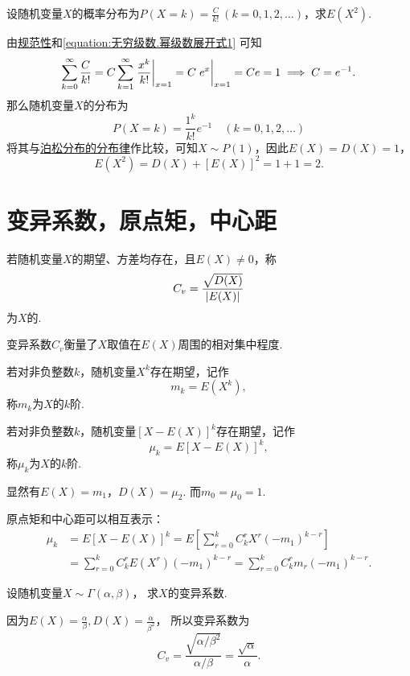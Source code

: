 \begin{example}
设随机变量\(X\)的概率分布为\(P(X=k) = \frac{C}{k!}\ (k=0,1,2,\dotsc)\)，求\(E(X^2)\).
\begin{solution}
由\hyperref[theorem:随机变量及其分布.离散型随机变量的密度函数的性质]{规范性}和\cref{equation:无穷级数.幂级数展开式1} 可知\[
\sum_{k=0}^\infty \frac{C}{k!}
= C \sum_{k=1}^\infty \eval{\frac{x^k}{k!}}_{x=1}
= C \eval{e^x}_{x=1}
= C e = 1
\implies
C = e^{-1}.
\]那么随机变量\(X\)的分布为\[
P(X=k) = \frac{1^k}{k!} e^{-1} \quad(k=0,1,2,\dotsc)
\]将其与\hyperref[equation:随机变量及其分布.泊松分布的分布律]{泊松分布的分布律}作比较，可知\(X \sim P(1)\)，因此\(E(X) = D(X) = 1\)，\[
E(X^2) = D(X) + [E(X)]^2 = 1 + 1 = 2.
\]
\end{solution}
\end{example}

\section{变异系数，原点矩，中心距}
\begin{definition}
若随机变量\(X\)的期望、方差均存在，且\(E(X) \neq 0\)，称\[
C_v = \frac{\sqrt{D(X)}}{\abs{E(X)}}
\]为\(X\)的.
\end{definition}
变异系数\(C_v\)衡量了\(X\)取值在\(E(X)\)周围的相对集中程度.

\begin{definition}
若对非负整数\(k\)，随机变量\(X^k\)存在期望，记作\[
m_k = E(X^k),
\]称\(m_k\)为\(X\)的\(k\)阶.
\end{definition}

\begin{definition}
若对非负整数\(k\)，随机变量\([X-E(X)]^k\)存在期望，记作\[
\mu_k = E[X-E(X)]^k,
\]称\(\mu_k\)为\(X\)的\(k\)阶.
\end{definition}

显然有\(E(X) = m_1\)，\(D(X) = \mu_2\).
而\(m_0 = \mu_0 = 1\).

原点矩和中心距可以相互表示：
\begin{align*}
	\mu_k &= E[X-E(X)]^k
	= E\left[ \sum_{r=0}^k{C_k^r X^r (-m_1)^{k-r}} \right] \\
	&= \sum_{r=0}^k{C_k^r E(X^r) (-m_1)^{k-r}}
	= \sum_{r=0}^k{C_k^r m_r (-m_1)^{k-r}}.
\end{align*}

\begin{example}
设随机变量\(X \sim \Gamma(\alpha,\beta)\)，
求\(X\)的变异系数.
\begin{solution}
因为\(E(X)=\frac\alpha\beta,
D(X)=\frac{\alpha}{\beta^2}\)，
所以变异系数为\[
	C_v = \frac{\sqrt{\alpha/\beta^2}}{\alpha/\beta}
	= \frac{\sqrt{\alpha}}{\alpha}.
\]
\end{solution}
\end{example}

